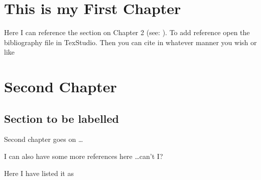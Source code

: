 \documentclass[openany]{book}
\begin{document}
\chapter{This is my First Chapter}



Here I can reference the section on Chapter 2 (see: ). To add reference open the bibliography file in TexStudio. Then you can cite in whatever manner you wish %
 or like %

\chapter{Second Chapter}
\section{Section to be labelled}  \label{sec_label}
Second chapter goes on \dots

I can also have some more references here \dots can't I? %

Here I have listed it as %





\begin{spacing}{0.9}
\renewcommand{\bibname}{References} %
\cleardoublepage
{} %

\end{spacing}
\end{document}

